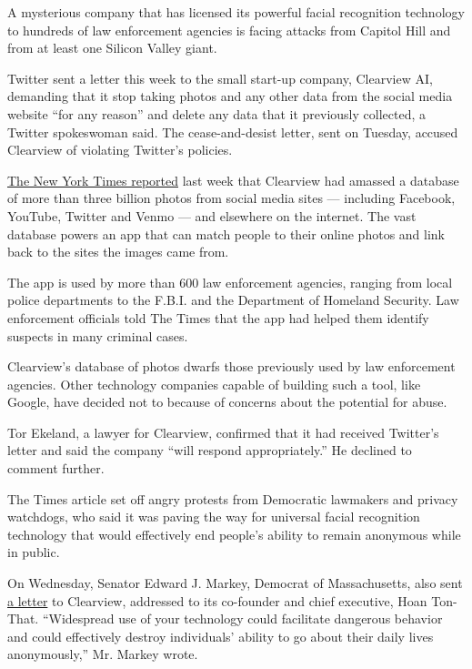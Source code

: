 A mysterious company that has licensed its powerful facial recognition
technology to hundreds of law enforcement agencies is facing attacks
from Capitol Hill and from at least one Silicon Valley giant.

Twitter sent a letter this week to the small start-up company, Clearview
AI, demanding that it stop taking photos and any other data from the
social media website ``for any reason'' and delete any data that it
previously collected, a Twitter spokeswoman said. The cease-and-desist
letter, sent on Tuesday, accused Clearview of violating Twitter's
policies.

\href{https://www.nytimes.com/2020/01/18/technology/clearview-privacy-facial-recognition.html}{The
New York Times reported} last week that Clearview had amassed a database
of more than three billion photos from social media sites --- including
Facebook, YouTube, Twitter and Venmo --- and elsewhere on the internet.
The vast database powers an app that can match people to their online
photos and link back to the sites the images came from.

The app is used by more than 600 law enforcement agencies, ranging from
local police departments to the F.B.I. and the Department of Homeland
Security. Law enforcement officials told The Times that the app had
helped them identify suspects in many criminal cases.

Clearview's database of photos dwarfs those previously used by law
enforcement agencies. Other technology companies capable of building
such a tool, like Google, have decided not to because of concerns about
the potential for abuse.

Tor Ekeland, a lawyer for Clearview, confirmed that it had received
Twitter's letter and said the company ``will respond appropriately.'' He
declined to comment further.

The Times article set off angry protests from Democratic lawmakers and
privacy watchdogs, who said it was paving the way for universal facial
recognition technology that would effectively end people's ability to
remain anonymous while in public.

On Wednesday, Senator Edward J. Markey, Democrat of Massachusetts, also
sent
\href{https://int.nyt.com/data/documenthelper/6718-sen-markey-letter-to-clearview/33422997119c3d43033d/optimized/full.pdf\#page=1}{a
letter} to Clearview, addressed to its co-founder and chief executive,
Hoan Ton-That. ``Widespread use of your technology could facilitate
dangerous behavior and could effectively destroy individuals' ability to
go about their daily lives anonymously,'' Mr. Markey wrote.

